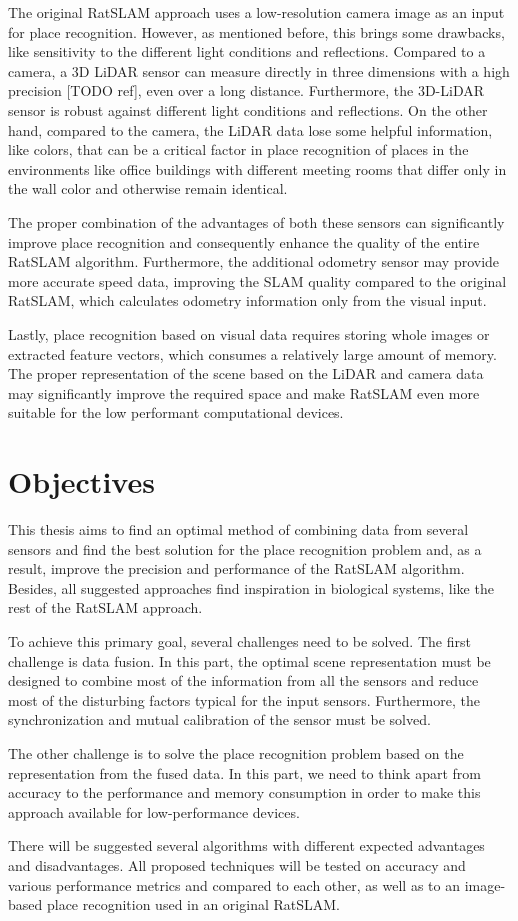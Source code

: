 The original RatSLAM approach uses a low-resolution camera image as an input for place recognition. However, as mentioned before, this brings some drawbacks, like sensitivity to the different light conditions and reflections. Compared to a camera, a 3D LiDAR sensor can measure directly in three dimensions with a high precision [TODO ref], even over a long distance. Furthermore, the 3D-LiDAR sensor is robust against different light conditions and reflections. On the other hand, compared to the camera, the LiDAR data lose some helpful information, like colors, that can be a critical factor in place recognition of places in the environments like office buildings with different meeting rooms that differ only in the wall color and otherwise remain identical.\par
The proper combination of the advantages of both these sensors can significantly improve place recognition and consequently enhance the quality of the entire RatSLAM algorithm. Furthermore, the additional odometry sensor may provide more accurate speed data, improving the SLAM quality compared to the original RatSLAM, which calculates odometry information only from the visual input.\par
Lastly, place recognition based on visual data requires storing whole images or extracted feature vectors, which consumes a relatively large amount of memory. The proper representation of the scene based on the LiDAR and camera data may significantly improve the required space and make RatSLAM even more suitable for the low performant computational devices.

\section{Objectives}

This thesis aims to find an optimal method of combining data from several sensors and find the best solution for the place recognition problem and, as a result, improve the precision and performance of the RatSLAM algorithm. Besides, all suggested approaches find inspiration in biological systems, like the rest of the RatSLAM approach.\par
To achieve this primary goal, several challenges need to be solved. The first challenge is data fusion. In this part, the optimal scene representation must be designed to combine most of the information from all the sensors and reduce most of the disturbing factors typical for the input sensors. Furthermore, the synchronization and mutual calibration of the sensor must be solved.\par
The other challenge is to solve the place recognition problem based on the representation from the fused data. In this part, we need to think apart from accuracy to the performance and memory consumption in order to make this approach available for low-performance devices.\par
There will be suggested several algorithms with different expected advantages and disadvantages. All proposed techniques will be tested on accuracy and various performance metrics and compared to each other, as well as to an image-based place recognition used in an original RatSLAM.

